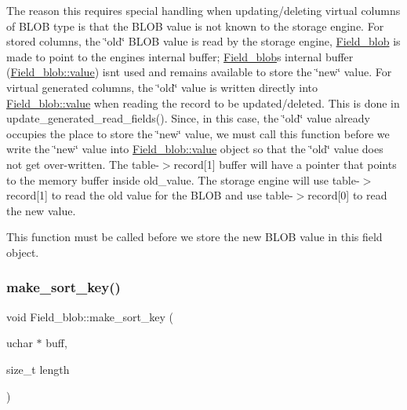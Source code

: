 The reason this requires special handling when updating/deleting virtual columns of B\+L\+OB type is that the B\+L\+OB value is not known to the storage engine. For stored columns, the \char`\"{}old\char`\"{} B\+L\+OB value is read by the storage engine, \mbox{\hyperlink{classField__blob}{Field\+\_\+blob}} is made to point to the engine\textquotesingle{}s internal buffer; \mbox{\hyperlink{classField__blob}{Field\+\_\+blob}}\textquotesingle{}s internal buffer (\mbox{\hyperlink{classField__blob_abc02fd1c1c4a61a46161d1a5e14f5a16}{Field\+\_\+blob\+::value}}) isn\textquotesingle{}t used and remains available to store the \char`\"{}new\char`\"{} value. For virtual generated columns, the \char`\"{}old\char`\"{} value is written directly into \mbox{\hyperlink{classField__blob_abc02fd1c1c4a61a46161d1a5e14f5a16}{Field\+\_\+blob\+::value}} when reading the record to be updated/deleted. This is done in update\+\_\+generated\+\_\+read\+\_\+fields(). Since, in this case, the \char`\"{}old\char`\"{} value already occupies the place to store the \char`\"{}new\char`\"{} value, we must call this function before we write the \char`\"{}new\char`\"{} value into \mbox{\hyperlink{classField__blob_abc02fd1c1c4a61a46161d1a5e14f5a16}{Field\+\_\+blob\+::value}} object so that the \char`\"{}old\char`\"{} value does not get over-\/written. The table-\/$>$record\mbox{[}1\mbox{]} buffer will have a pointer that points to the memory buffer inside old\+\_\+value. The storage engine will use table-\/$>$record\mbox{[}1\mbox{]} to read the old value for the B\+L\+OB and use table-\/$>$record\mbox{[}0\mbox{]} to read the new value.

This function must be called before we store the new B\+L\+OB value in this field object. \mbox{\label{classField__blob_adfbed1cc92f6593bc9f5961cb138b5a8}} 
\subsubsection{\texorpdfstring{make\+\_\+sort\+\_\+key()}{make\_sort\_key()}}
{\footnotesize\ttfamily void Field\+\_\+blob\+::make\+\_\+sort\+\_\+key (\begin{DoxyParamCaption}\item[{uchar $\ast$}]{buff,  }\item[{size\+\_\+t}]{length }\end{DoxyParamCaption})\hspace{0.3cm}{\ttfamily [virtual]}}

